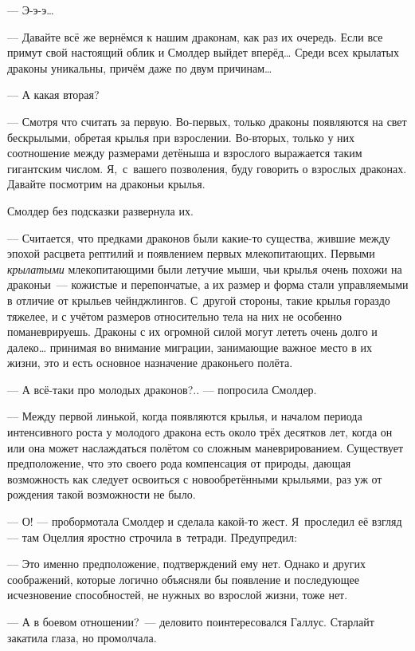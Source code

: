 \documentclass[fontsize=11pt,a5paper,titlepage=firstcover]{scrbook}
\begin{document}
--- Э-э-э{\ldots}

--- Давайте всё же вернёмся к нашим драконам, как раз их очередь. Если все примут свой настоящий облик и Смолдер выйдет вперёд{\ldots} Среди всех крылатых драконы уникальны, причём даже по двум причинам{\ldots}

--- А какая вторая?

--- Смотря что считать за первую. Во-первых, только драконы появляются на свет бескрылыми, обретая крылья при взрослении. Во-вторых, только у них соотношение между размерами детёныша и взрослого выражается таким гигантским числом. Я,~с~вашего позволения, буду говорить о взрослых драконах. Давайте посмотрим на драконьи крылья.

Смолдер без подсказки развернула их.

--- Считается, что предками драконов были какие-то существа, жившие между эпохой расцвета рептилий и появлением первых млекопитающих. Первыми \emph{крылатыми} млекопитающими были летучие мыши, чьи крылья очень похожи на драконьи~--- кожистые и перепончатые, а их размер и форма стали управляемыми в отличие от крыльев чейнджлингов. С~другой стороны, такие крылья гораздо тяжелее, и с учётом размеров относительно тела на них не особенно поманеврируешь. Драконы с их огромной силой могут лететь очень долго и далеко{\ldots} принимая во внимание миграции, занимающие важное место в их жизни, это и есть основное назначение драконьего полёта.

--- А всё-таки про молодых драконов?.. --- попросила Смолдер.

--- Между первой линькой, когда появляются крылья, и началом периода интенсивного роста у молодого дракона есть около трёх десятков лет, когда он или она может наслаждаться полётом со сложным маневрированием. Существует предположение, что это своего рода компенсация от природы, дающая возможность как следует освоиться с новообретёнными крыльями, раз уж от рождения такой возможности не было.

--- О! --- пробормотала Смолдер и сделала какой-то жест. Я~проследил её взгляд --- там Оцеллия яростно строчила в~тетради. Предупредил:

--- Это именно предположение, подтверждений ему нет. Однако и других соображений, которые логично объясняли бы появление и последующее исчезновение способностей, не нужных во взрослой жизни, тоже нет.

--- А в боевом отношении?~--- деловито поинтересовался Галлус. Старлайт закатила глаза, но промолчала.
\end{document}
